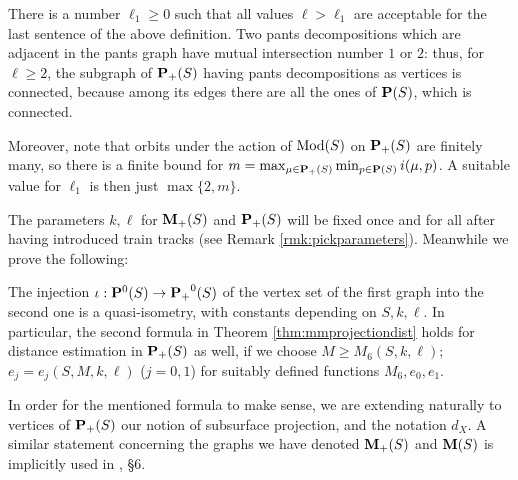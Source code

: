 \begin{rmk}\label{rmk:ell1}
There is a number $\ell_1\geq 0$ such that all values $\ell>\ell_1$ are acceptable for the last sentence of the above definition. Two pants decompositions which are adjacent in the pants graph have mutual intersection number $1$ or $2$: thus, for $\ell\geq 2$, the subgraph of ${\mathbf{P}_+}(S)$ having pants decompositions as vertices is connected, because among its edges there are all the ones of $\mathbf P(S)$, which is connected.

Moreover, note that orbits under the action of $\mathrm{Mod}(S)$ on ${\mathbf{P}_+}(S)$ are finitely many, so there is a finite bound for $m=\max_{\mu\in{\mathbf{P}_+}(S)}\min_{p\in\mathbf P(S)} i(\mu,p)$. A suitable value for $\ell_1$ is then just $\max\{2,m\}$.
\end{rmk}

The parameters $k,\ell$ for ${\mathbf{M}_+}(S)$ and ${\mathbf{P}_+}(S)$ will be fixed once and for all after having introduced train tracks (see Remark \ref{rmk:pickparameters}). Meanwhile we prove the following:
\begin{lemma}\label{lem:pantsquasiisom}
The injection $\iota:\mathbf P^0(S)\rightarrow{\mathbf{P}_+}^0(S)$ of the vertex set of the first graph into the second one is a quasi-isometry, with constants depending on $S,k,\ell$. In particular, the second formula in Theorem \ref{thm:mmprojectiondist} holds for distance estimation in ${\mathbf{P}_+}(S)$ as well, if we choose $M\geq M_6(S,k,\ell)$; $e_j=e_j(S,M,k,\ell)$ ($j=0,1$) for suitably defined functions $M_6,e_0,e_1$.
\end{lemma}

In order for the mentioned formula to make sense, we are extending naturally to vertices of ${\mathbf{P}_+}(S)$ our notion of subsurface projection, and the notation $d_X$. A similar statement concerning the graphs we have denoted ${\mathbf{M}_+}(S)$ and $\mathbf M(S)$ is implicitly used in \cite{mms}, \S 6.

